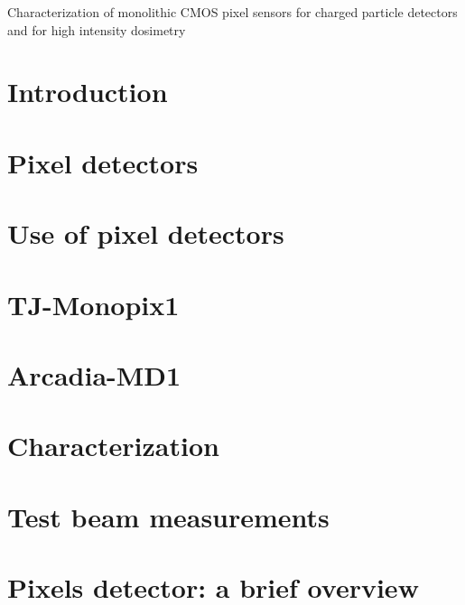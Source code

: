 \documentclass[a4paper,11pt]{report}
\begin{document}
\linenumbers

\tableofcontents

Characterization of monolithic CMOS pixel sensors for charged particle detectors and for high intensity dosimetry 

\chapter{Introduction}


\chapter{Pixel detectors}


\chapter{Use of pixel detectors}


\chapter{TJ-Monopix1}\label{chap:Monopix1}


\chapter{Arcadia-MD1}


\chapter{Characterization}


\chapter{Test beam measurements}



\appendix
\chapter{Pixels detector: a brief overview}




\printbibliography[heading=bibintoc, title={Bibliography}] 
\end{document}
